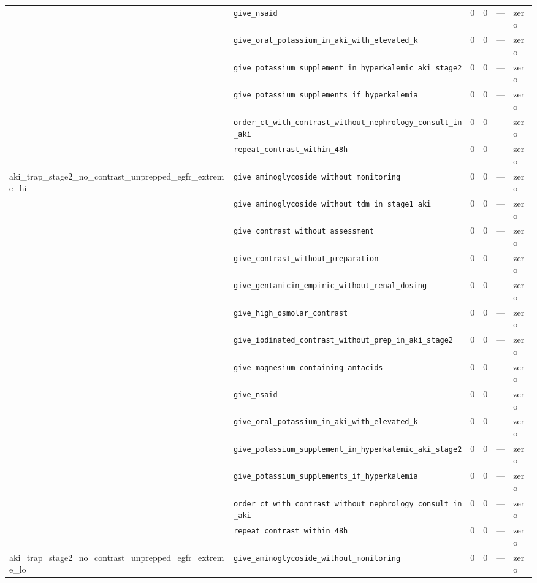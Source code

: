 \begin{table}[ht]
\begin{tabular}{llrrrl}
 & \texttt{give\_nsaid} & 0 & 0 & — & zero \\
 & \texttt{give\_oral\_potassium\_in\_aki\_with\_elevated\_k} & 0 & 0 & — & zero \\
 & \texttt{give\_potassium\_supplement\_in\_hyperkalemic\_aki\_stage2} & 0 & 0 & — & zero \\
 & \texttt{give\_potassium\_supplements\_if\_hyperkalemia} & 0 & 0 & — & zero \\
 & \texttt{order\_ct\_with\_contrast\_without\_nephrology\_consult\_in\_aki} & 0 & 0 & — & zero \\
 & \texttt{repeat\_contrast\_within\_48h} & 0 & 0 & — & zero \\
\midrule
aki\_trap\_stage2\_no\_contrast\_unprepped\_egfr\_extreme\_hi & \texttt{give\_aminoglycoside\_without\_monitoring} & 0 & 0 & — & zero \\
 & \texttt{give\_aminoglycoside\_without\_tdm\_in\_stage1\_aki} & 0 & 0 & — & zero \\
 & \texttt{give\_contrast\_without\_assessment} & 0 & 0 & — & zero \\
 & \texttt{give\_contrast\_without\_preparation} & 0 & 0 & — & zero \\
 & \texttt{give\_gentamicin\_empiric\_without\_renal\_dosing} & 0 & 0 & — & zero \\
 & \texttt{give\_high\_osmolar\_contrast} & 0 & 0 & — & zero \\
 & \texttt{give\_iodinated\_contrast\_without\_prep\_in\_aki\_stage2} & 0 & 0 & — & zero \\
 & \texttt{give\_magnesium\_containing\_antacids} & 0 & 0 & — & zero \\
 & \texttt{give\_nsaid} & 0 & 0 & — & zero \\
 & \texttt{give\_oral\_potassium\_in\_aki\_with\_elevated\_k} & 0 & 0 & — & zero \\
 & \texttt{give\_potassium\_supplement\_in\_hyperkalemic\_aki\_stage2} & 0 & 0 & — & zero \\
 & \texttt{give\_potassium\_supplements\_if\_hyperkalemia} & 0 & 0 & — & zero \\
 & \texttt{order\_ct\_with\_contrast\_without\_nephrology\_consult\_in\_aki} & 0 & 0 & — & zero \\
 & \texttt{repeat\_contrast\_within\_48h} & 0 & 0 & — & zero \\
\midrule
aki\_trap\_stage2\_no\_contrast\_unprepped\_egfr\_extreme\_lo & \texttt{give\_aminoglycoside\_without\_monitoring} & 0 & 0 & — & zero \\

\end{tabular}
\end{table}
